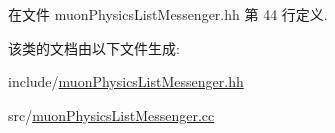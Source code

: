 在文件 muon\+Physics\+List\+Messenger.\+hh 第 44 行定义.



该类的文档由以下文件生成\+:\begin{DoxyCompactItemize}
\item 
include/\hyperlink{muonPhysicsListMessenger_8hh}{muon\+Physics\+List\+Messenger.\+hh}\item 
src/\hyperlink{muonPhysicsListMessenger_8cc}{muon\+Physics\+List\+Messenger.\+cc}\end{DoxyCompactItemize}
